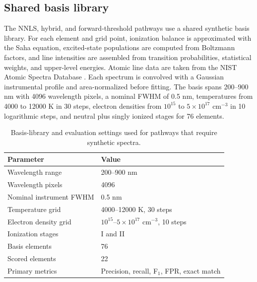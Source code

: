 \documentclass[preprint,12pt,authoryear]{elsarticle}
\begin{document}
\subsection{Shared basis library}

The NNLS, hybrid, and forward-threshold pathways use a shared synthetic basis library. For each element and grid point, ionization balance is approximated with the Saha equation, excited-state populations are computed from Boltzmann factors, and line intensities are assembled from transition probabilities, statistical weights, and upper-level energies. Atomic line data are taken from the NIST Atomic Spectra Database \citep{KramidaNISTASD}. Each spectrum is convolved with a Gaussian instrumental profile and area-normalized before fitting. The basis spans 200--900 nm with 4096 wavelength pixels, a nominal FWHM of 0.5 nm, temperatures from 4000 to 12000 K in 30 steps, electron densities from $10^{15}$ to $5\times10^{17}$ cm$^{-3}$ in 10 logarithmic steps, and neutral plus singly ionized stages for 76 elements.

\begin{table}[t]
\centering
\caption{Basis-library and evaluation settings used for pathways that require synthetic spectra.}
\label{tab:basis}
\begin{tabular}{ll}
\toprule
Parameter & Value \\
\midrule
Wavelength range & 200--900 nm \\
Wavelength pixels & 4096 \\
Nominal instrument FWHM & 0.5 nm \\
Temperature grid & 4000--12000 K, 30 steps \\
Electron density grid & $10^{15}$--$5\times10^{17}$ cm$^{-3}$, 10 steps \\
Ionization stages & I and II \\
Basis elements & 76 \\
Scored elements & 22 \\
Primary metrics & Precision, recall, F$_1$, FPR, exact match \\
\bottomrule
\end{tabular}
\end{table}
\end{document}
